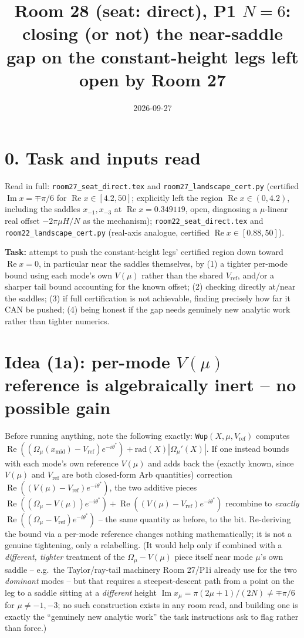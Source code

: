 \documentclass[11pt]{article}
\title{Room 28 (seat: direct), P1 $N=6$: closing (or not) the near-saddle gap on the constant-height
legs left open by Room 27}
\date{2026-09-27}
\begin{document}
\maketitle

\section*{0. Task and inputs read}
Read in full: \texttt{room27\_seat\_direct.tex} and \texttt{room27\_landscape\_cert.py} (certified
$\operatorname{Im}x=\mp\pi/6$ for $\operatorname{Re}x\in[4.2,50]$; explicitly left the region
$\operatorname{Re}x\in(0,4.2)$, including the saddles $x_{-1},x_{-3}$ at $\operatorname{Re}x=0.349119$,
open, diagnosing a $\mu$-linear real offset $-2\pi\mu H/N$ as the mechanism); \texttt{room22\_seat\_direct.tex}
and \texttt{room22\_landscape\_cert.py} (real-axis analogue, certified $\operatorname{Re}x\in[0.88,50]$).

\textbf{Task:} attempt to push the constant-height legs' certified region down toward
$\operatorname{Re}x=0$, in particular near the saddles themselves, by (1) a tighter per-mode bound
using each mode's own $V(\mu)$ rather than the shared $V_{\mathrm{ref}}$, and/or a sharper tail bound
accounting for the known offset; (2) checking directly at/near the saddles; (3) if full certification
is not achievable, finding precisely how far it CAN be pushed; (4) being honest if the gap needs genuinely
new analytic work rather than tighter numerics.

\section{Idea (1a): per-mode $V(\mu)$ reference is algebraically inert -- no possible gain}
Before running anything, note the following exactly: \texttt{Wup}$(X,\mu,V_{\mathrm{ref}})$ computes
$\operatorname{Re}((\Omega_\mu(x_{\mathrm{mid}})-V_{\mathrm{ref}})e^{-i\theta^\ast})+\mathrm{rad}(X)|\Omega_\mu'(X)|$.
If one instead bounds with each mode's own reference $V(\mu)$ and adds back the (exactly known, since
$V(\mu)$ and $V_{\mathrm{ref}}$ are both closed-form Arb quantities) correction
$\operatorname{Re}((V(\mu)-V_{\mathrm{ref}})e^{-i\theta^\ast})$, the two additive pieces
$\operatorname{Re}((\Omega_\mu-V(\mu))e^{-i\theta^\ast})+\operatorname{Re}((V(\mu)-V_{\mathrm{ref}})e^{-i\theta^\ast})$
recombine to \emph{exactly} $\operatorname{Re}((\Omega_\mu-V_{\mathrm{ref}})e^{-i\theta^\ast})$ -- the same
quantity as before, to the bit. Re-deriving the bound via a per-mode reference changes nothing
mathematically; it is not a genuine tightening, only a relabelling. (It would help only if combined with a
\emph{different, tighter} treatment of the $\Omega_\mu-V(\mu)$ piece itself near mode $\mu$'s own saddle
-- e.g.\ the Taylor/ray-tail machinery Room 27/P1i already use for the two \emph{dominant} modes -- but
that requires a steepest-descent path from a point on the leg to a saddle sitting at a \emph{different}
height $\operatorname{Im}x_\mu=\pi(2\mu+1)/(2N)\ne\mp\pi/6$ for $\mu\ne-1,-3$; no such construction exists
in any room read, and building one is exactly the ``genuinely new analytic work'' the task instructions
ask to flag rather than force.)
\end{document}
